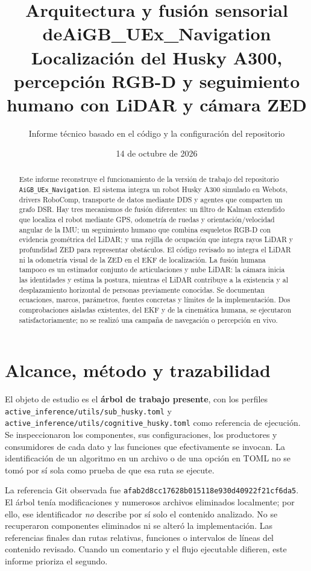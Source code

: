 \documentclass[11pt,a4paper]{article}
\title{\textbf{Arquitectura y fusión sensorial de\newline AiGB\_UEx\_Navigation}\\[0.6em]\large Localización del Husky A300, percepción RGB-D y seguimiento humano con LiDAR y cámara ZED}
\author{Informe técnico basado en el código y la configuración del repositorio}
\date{14 de octubre de 2026}
\newcommand{\code}[1]{\nolinkurl{#1}}
\newcommand{\file}[1]{\nolinkurl{#1}}
\begin{document}
\maketitle

\begin{abstract}
Este informe reconstruye el funcionamiento de la versión de trabajo del repositorio
\code{AiGB_UEx_Navigation}. El sistema integra un robot Husky A300 simulado en Webots,
drivers RoboComp, transporte de datos mediante DDS y agentes que comparten un grafo
DSR. Hay tres mecanismos de fusión diferentes: un filtro de Kalman extendido que
localiza el robot mediante GPS, odometría de ruedas y orientación/velocidad angular
de la IMU; un seguimiento humano que combina esqueletos RGB-D con evidencia
geométrica del LiDAR; y una rejilla de ocupación que integra rayos LiDAR y profundidad
ZED para representar obstáculos. El código revisado no integra el LiDAR ni la
odometría visual de la ZED en el EKF de localización. La fusión humana tampoco es un
estimador conjunto de articulaciones y nube LiDAR: la cámara inicia las identidades
y estima la postura, mientras el LiDAR contribuye a la existencia y al desplazamiento
horizontal de personas previamente conocidas. Se documentan ecuaciones, marcos,
parámetros, fuentes concretas y límites de la implementación. Dos comprobaciones
aisladas existentes, del EKF y de la cinemática humana, se ejecutaron satisfactoriamente;
no se realizó una campaña de navegación o percepción en vivo.
\end{abstract}

\newpage
\setcounter{tocdepth}{1}
\tableofcontents
\newpage

\section{Alcance, método y trazabilidad}
\label{sec:scope}

El objeto de estudio es el \textbf{árbol de trabajo presente}, con los perfiles
\file{active_inference/utils/sub_husky.toml} y
\file{active_inference/utils/cognitive_husky.toml} como referencia de ejecución.
Se inspeccionaron los componentes, sus configuraciones, los productores y consumidores
de cada dato y las funciones que efectivamente se invocan. La identificación de un
algoritmo en un archivo o de una opción en TOML no se tomó por sí sola como prueba
de que esa ruta se ejecute.~\cite{launchsub,launchcog}

La referencia Git observada fue
\code{afab2d8cc17628b015118e930d40922f21cf6da5}. El árbol tenía modificaciones y
numerosos archivos eliminados localmente; por ello, ese identificador \emph{no}
describe por sí solo el contenido analizado. No se recuperaron componentes eliminados
ni se alteró la implementación. Las referencias finales dan rutas relativas,
funciones o intervalos de líneas del contenido revisado. Cuando un comentario y el
flujo ejecutable difieren, este informe prioriza el segundo.
\end{document}
